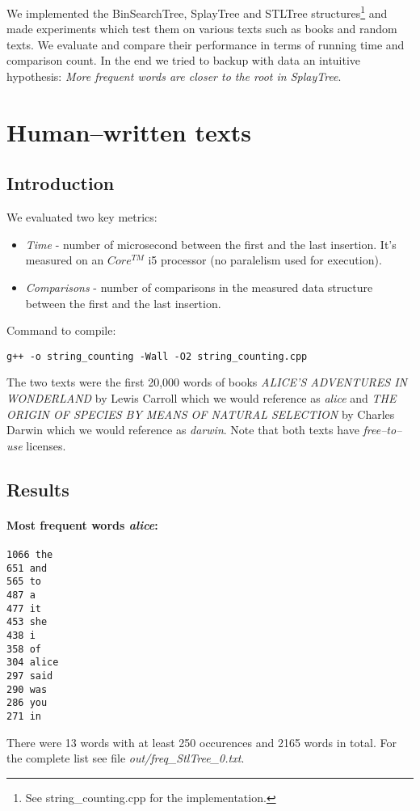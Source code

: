 \documentclass[12pt,a4paper]{article}
\begin{document}
We implemented the BinSearchTree, SplayTree and STLTree structures\footnote{See string\_counting.cpp for the implementation.
} and made experiments which test them on various texts such as books and random texts. We evaluate and compare their performance in terms of running time and comparison count. In the end we tried to backup with data an intuitive hypothesis: \emph{More frequent words are closer to the root in SplayTree}. 

\section{Human--written texts} 
\subsection{Introduction} 
We evaluated two key metrics:
\begin{itemize} 
\item \emph{Time} - number of microsecond between the first and the last insertion. It's measured on an  $Core^{TM}$ i5 processor (no paralelism used for execution). 
\item \emph{Comparisons} - number of comparisons in the measured data structure between the first and the last insertion. 
\end{itemize}

Command to compile: 
\begin{lstlisting}
g++ -o string_counting -Wall -O2 string_counting.cpp
\end{lstlisting}

The two texts were the first 20,000 words of books \emph{ALICE'S ADVENTURES IN WONDERLAND} by Lewis Carroll which we would reference as \emph{alice} and \emph{THE ORIGIN OF SPECIES BY MEANS OF NATURAL SELECTION} by Charles Darwin which we would reference as \emph{darwin}. Note that both texts have \emph{free--to--use} licenses. 

\subsection{Results} 
\paragraph{Most frequent words \emph{alice}:}
\begin{lstlisting}
1066 the
651 and
565 to
487 a
477 it
453 she
438 i
358 of
304 alice
297 said
290 was
286 you
271 in
\end{lstlisting}
There were 13 words with at least 250 occurences and 2165 words in total. 
For the complete list see file \emph{out/freq\_StlTree\_0.txt}. 
\end{document}

